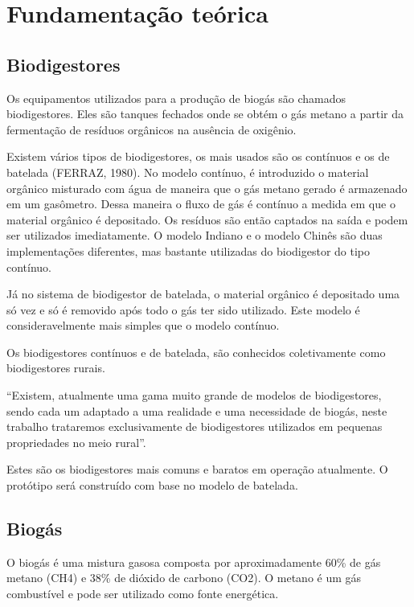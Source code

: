 \chapter{Fundamentação teórica}

\section{Biodigestores}

Os equipamentos utilizados para a produção de biogás são chamados biodigestores. Eles são tanques fechados onde se obtém o gás metano a partir da fermentação de resíduos orgânicos na ausência de oxigênio.

Existem vários tipos de biodigestores, os mais usados são os contínuos e os de batelada (FERRAZ, 1980). No modelo contínuo, é introduzido o material orgânico misturado com água de maneira que o gás metano gerado é armazenado em um gasômetro. Dessa maneira o fluxo de gás é contínuo a medida em que o material orgânico é depositado. Os resíduos são então captados na saída e podem ser utilizados imediatamente. O modelo Indiano e o modelo Chinês são duas implementações diferentes, mas bastante utilizadas do biodigestor do tipo contínuo.

Já no sistema de biodigestor de batelada, o material orgânico é depositado uma só vez e só é removido após todo o gás ter sido utilizado. Este modelo é consideravelmente mais simples que o modelo contínuo.  

Os biodigestores contínuos e de batelada, são conhecidos coletivamente como biodigestores rurais.

\begin{citacao}
“Existem, atualmente uma gama muito grande de modelos de biodigestores, sendo cada um adaptado a uma realidade e uma necessidade de biogás, neste trabalho trataremos exclusivamente de biodigestores utilizados em pequenas propriedades no meio rural”.\cite{abntex2-wiki-como-customizar}
\end{citacao}

Estes são os biodigestores mais comuns e baratos em operação atualmente. O protótipo será construído com base no modelo de batelada.

\section{Biogás}

O biogás é uma mistura gasosa composta por aproximadamente 60\% de gás metano (CH4) e 38\% de dióxido de carbono (CO2). O metano é um gás combustível e pode ser utilizado como fonte energética.

